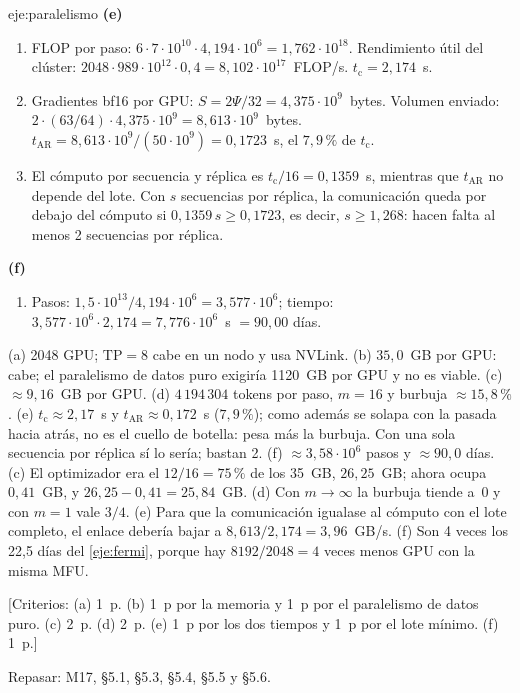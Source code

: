 \begin{solucion}{eje:paralelismo}
\noindent\textbf{(e)}
\begin{enumerate}[label=\arabic*.]
  \item FLOP por paso: $6\cdot 7\cdot 10^{10}\cdot 4{,}194\cdot 10^{6}=1{,}762\cdot 10^{18}$. Rendimiento útil del clúster: $2048\cdot 989\cdot 10^{12}\cdot 0{,}4=8{,}102\cdot 10^{17}$~FLOP/s. $t_{\mathrm{c}}=2{,}174$~s.
  \item Gradientes bf16 por GPU: $S=2\Psi/32=4{,}375\cdot 10^{9}$~bytes. Volumen enviado: $2\cdot(63/64)\cdot 4{,}375\cdot 10^{9}=8{,}613\cdot 10^{9}$~bytes. $t_{\mathrm{AR}}=8{,}613\cdot 10^{9}/(50\cdot 10^{9})=0{,}1723$~s, el $7{,}9\,\%$ de $t_{\mathrm{c}}$.
  \item El cómputo por secuencia y réplica es $t_{\mathrm{c}}/16=0{,}1359$~s, mientras que $t_{\mathrm{AR}}$ no depende del lote. Con $s$ secuencias por réplica, la comunicación queda por debajo del cómputo si $0{,}1359\,s\ge 0{,}1723$, es decir, $s\ge 1{,}268$: hacen falta al menos 2 secuencias por réplica.
\end{enumerate}

\noindent\textbf{(f)}
\begin{enumerate}[label=\arabic*.]
  \item Pasos: $1{,}5\cdot 10^{13}/4{,}194\cdot 10^{6}=3{,}577\cdot 10^{6}$; tiempo: $3{,}577\cdot 10^{6}\cdot 2{,}174=7{,}776\cdot 10^{6}$~s $=90{,}00$ días.
\end{enumerate}
\resultado (a) 2048 GPU; $\mathrm{TP}=8$ cabe en un nodo y usa NVLink. (b) $35{,}0$~GB por GPU: cabe; el paralelismo de datos puro exigiría 1120~GB por GPU y no es viable. (c) $\approx 9{,}16$~GB por GPU. (d) $4\,194\,304$ tokens por paso, $m=16$ y burbuja $\approx 15{,}8\,\%$. (e) $t_{\mathrm{c}}\approx 2{,}17$~s y $t_{\mathrm{AR}}\approx 0{,}172$~s ($7{,}9\,\%$); como además se solapa con la pasada hacia atrás, no es el cuello de botella: pesa más la burbuja. Con una sola secuencia por réplica sí lo sería; bastan 2. (f) $\approx 3{,}58\cdot 10^{6}$ pasos y $\approx 90{,}0$ días.
\comprobacion (c) El optimizador era el $12/16=75\,\%$ de los 35~GB, $26{,}25$~GB; ahora ocupa $0{,}41$~GB, y $26{,}25-0{,}41=25{,}84$~GB. (d) Con $m\to\infty$ la burbuja tiende a~0 y con $m=1$ vale $3/4$. (e) Para que la comunicación igualase al cómputo con el lote completo, el enlace debería bajar a $8{,}613/2{,}174=3{,}96$~GB/s. (f) Son 4 veces los 22{,}5 días del \cref{eje:fermi}, porque hay $8192/2048=4$ veces menos GPU con la misma MFU.

[Criterios: (a) 1~p. (b) 1~p por la memoria y 1~p por el paralelismo de datos puro. (c) 2~p. (d) 2~p. (e) 1~p por los dos tiempos y 1~p por el lote mínimo. (f) 1~p.]

Repasar: M17, §5.1, §5.3, §5.4, §5.5 y §5.6.
\end{solucion}

